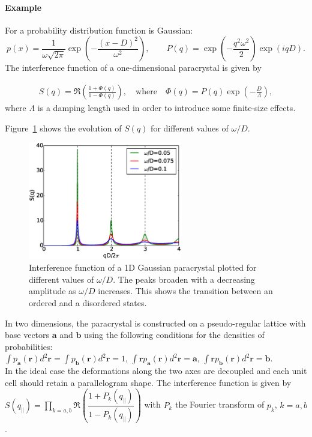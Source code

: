 \paragraph{Example} For a probability distribution function is Gaussian:
\begin{equation*}
p(x)=\frac{1}{\omega \sqrt{2\pi}} \exp\left(-\dfrac{(x-D)^2}{\omega^2}\right),\qquad P(q)=\exp\left(-\frac{q^2 \omega^2}{2}\right)\exp(iqD).
\end{equation*}
 The interference function of a one-dimensional paracrystal is given by

\begin{align*}
S(q) =\Re \left(\frac{1+\Phi(q) }{1 - \Phi(q)} \right), \quad \mathrm{where}\quad \Phi(q) = P(q)\exp\left(-\frac{D}{\Lambda}\right),
\end{align*}
where $\Lambda$ is a damping length used in order to introduce some finite-size effects.

Figure~\ref{fig:1dparas_q} shows the evolution of $S(q)$ for different values of $\omega /D$. 

\begin{figure}[ht]
\begin{center}
\includegraphics[width=0.6\textwidth]{Figures/funcplot/S_q_1Dparacrystal.eps}
\end{center}
\caption{Interference function of a 1D Gaussian paracrystal plotted for different values of $\omega /D$. The peaks broaden with a decreasing amplitude as $\omega/D$ increases. This shows the transition between an ordered and a disordered states. }
\label{fig:1dparas_q}
\end{figure}



In two dimensions, the paracrystal is constructed on a pseudo-regular lattice with base vectors $\mathbf{a}$ and $\mathbf{b}$ using the following conditions for the densities of probabilities:\\ $\int p_{\mathbf{a}}(\mathbf{r})d^2\mathbf{r}=\int p_{\mathbf{b}}(\mathbf{r})d^2\mathbf{r}=1$, $\int \mathbf{r} p_{\mathbf{a}}(\mathbf{r})d^2\mathbf{r}=\mathbf{a}$, $\int \mathbf{r} p_{\mathbf{b}}(\mathbf{r})d^2\mathbf{r}=\mathbf{b}$.\\
In the ideal case the deformations along the two axes are decoupled and each unit cell should retain a parallelogram shape. The interference function is given by\\ $S(q_{\parallel})=\prod_{k=a,b}\Re\left(\dfrac{1+P_k(q_{\parallel})}{1-P_k(q_{\parallel})} \right)$ with $P_k$ the Fourier transform of $p_k$, $k=a, b$.

